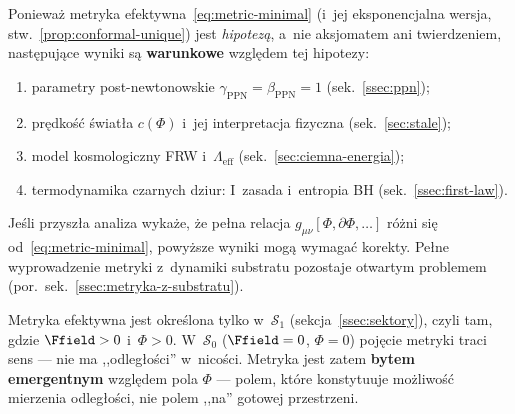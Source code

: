 \begin{remark}\label{rem:conditional-results}
Poniewa\.z metryka efektywna~\eqref{eq:metric-minimal}
(i~jej eksponencjalna wersja, stw.~\ref{prop:conformal-unique})
jest \emph{hipotez\k{a}}, a~nie aksjomatem ani twierdzeniem,
nast\k{e}puj\k{a}ce wyniki s\k{a} \textbf{warunkowe} wzgl\k{e}dem
tej hipotezy:
\begin{enumerate}[nosep]
  \item parametry post-newtonowskie $\gamma_{\mathrm{PPN}} = \beta_{\mathrm{PPN}} = 1$
        (sek.~\ref{ssec:ppn});
  \item pr\k{e}dko\'s\'c \'swiat\l{}a $c(\Phi)$ i~jej interpretacja
        fizyczna (sek.~\ref{sec:stale});
  \item model kosmologiczny FRW i~$\Lambda_{\mathrm{eff}}$
        (sek.~\ref{sec:ciemna-energia});
  \item termodynamika czarnych dziur: I~zasada i~entropia BH
        (sek.~\ref{ssec:first-law}).
\end{enumerate}
Je\'sli przysz\l{}a analiza wyka\.ze, \.ze pe\l{}na relacja
$g_{\mu\nu}[\Phi,\partial\Phi,\ldots]$ r\'o\.zni si\k{e}
od~\eqref{eq:metric-minimal}, powy\.zsze wyniki mog\k{a} wymaga\'c
korekty. Pe\l{}ne wyprowadzenie metryki z~dynamiki substratu
pozostaje otwartym problemem (por.~sek.~\ref{ssec:metryka-z-substratu}).
\end{remark}

\begin{remark}\label{rem:metryka-F}
Metryka efektywna jest okre\'slona tylko w~$\mathcal{S}_1$
(sekcja~\ref{ssec:sektory}), czyli tam, gdzie $\Ffield > 0$
i~$\Phi > 0$. W~$\mathcal{S}_0$ ($\Ffield = 0$, $\Phi = 0$)
poj\k{e}cie metryki traci sens --- nie ma ,,odleg\l{}o\'sci''
w~nico\'sci. Metryka jest zatem \textbf{bytem emergentnym}
wzgl\k{e}dem pola $\Phi$ --- polem, kt\'ore konstytuuje
mo\.zliwo\'s\'c mierzenia odleg\l{}o\'sci, nie polem ,,na''
gotowej przestrzeni.
\end{remark}
